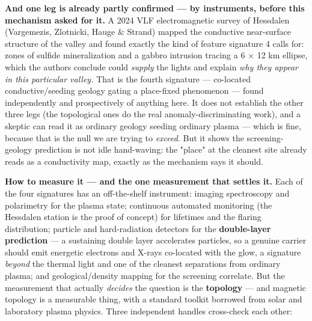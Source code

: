 \documentclass[11pt]{article}
\begin{document}
\textbf{And one leg is already partly confirmed --- by instruments, before this mechanism asked for it.} A 2024 VLF electromagnetic survey of Hessdalen (Vargemezis, Zlotnicki, Hauge \& Strand) mapped the conductive near-surface structure of the valley and found exactly the kind of feature signature 4 calls for: zones of sulfide mineralization and a gabbro intrusion tracing a 6 × 12 km ellipse, which the authors conclude could \emph{supply} the lights and explain \emph{why they appear in this particular valley.} That is the fourth signature --- co-located conductive/seeding geology gating a place-fixed phenomenon --- found independently and prospectively of anything here. It does not establish the other three legs (the topological ones do the real anomaly-discriminating work), and a skeptic can read it as ordinary geology seeding ordinary plasma --- which is fine, because that is the null we are trying to \emph{exceed}. But it shows the screening-geology prediction is not idle hand-waving: the "place" at the cleanest site already reads as a conductivity map, exactly as the mechanism says it should.

\textbf{How to measure it --- and the one measurement that settles it.} Each of the four signatures has an off-the-shelf instrument: imaging spectroscopy and polarimetry for the plasma state; continuous automated monitoring (the Hessdalen station is the proof of concept) for lifetimes and the flaring distribution; particle and hard-radiation detectors for the \textbf{double-layer prediction} --- a sustaining double layer accelerates particles, so a genuine carrier should emit energetic electrons and X-rays co-located with the glow, a signature \emph{beyond} the thermal light and one of the cleanest separations from ordinary plasma; and geological/density mapping for the screening correlate. But the measurement that actually \emph{decides} the question is the \textbf{topology} --- and magnetic topology is a measurable thing, with a standard toolkit borrowed from solar and laboratory plasma physics. Three independent handles cross-check each other:
\end{document}
